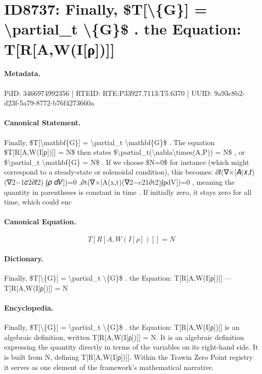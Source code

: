 \section*{ID8737: Finally, \$T[\textbackslash{}\{G\}] = \textbackslash{}partial\_t \textbackslash{}\{G\}\$ . the Equation: T[R[A,W(I[ρ])]]}
\paragraph{Metadata.}
PiID: 3466974992356 | RTEID: RTE:P33927.7113:T5.6370 | UUID: 9a93c8b2-d23f-5a79-8772-b76f4273660a

\paragraph{Canonical Statement.}
Finally, \$T[\textbackslash{}mathbf\{G\}] = \textbackslash{}partial\_t \textbackslash{}mathbf\{G\}\$ . The equation \$T[R[A,W(I[ρ])]] = N\$ then states \$\textbackslash{}partial\_t(\textbackslash{}nabla\textbackslash{}times(A,P)) = N\$ , or \$\textbackslash{}partial\_t \textbackslash{}mathbf\{G\} = N\$ . If we choose \$N=0\$ for instance (which might correspond to a steady-state or solenoidal condition), this becomes: ∂𝑡(∇×[𝐴(𝑥,𝑡) (∇2−1𝑐2∂𝑡2) ⁣∫𝜌 𝑑𝑉])=0 ,∂t​(∇×[A(x,t)(∇2−c21​∂t2​)∫ρdV])=0 , meaning the quantity in parentheses is constant in time . If initially zero, it stays zero for all time, which could enc

\paragraph{Canonical Equation.}
\[
T[R[A,W(I[ρ])]] = N
\]

\paragraph{Dictionary.}
Finally, \$T[\textbackslash{}\{G\}] = \textbackslash{}partial\_t \textbackslash{}\{G\}\$ . the Equation: T[R[A,W(I[ρ])]] — T[R[A,W(I[ρ])]] = N

\paragraph{Encyclopedia.}
Finally, \$T[\textbackslash{}\{G\}] = \textbackslash{}partial\_t \textbackslash{}\{G\}\$ . the Equation: T[R[A,W(I[ρ])]] is an algebraic definition, written T[R[A,W(I[ρ])]] = N. It is an algebraic definition expressing the quantity directly in terms of the variables on its right-hand side. It is built from N, defining T[R[A,W(I[ρ])]]. Within the Trawin Zero Point registry it serves as one element of the framework's mathematical narrative.
